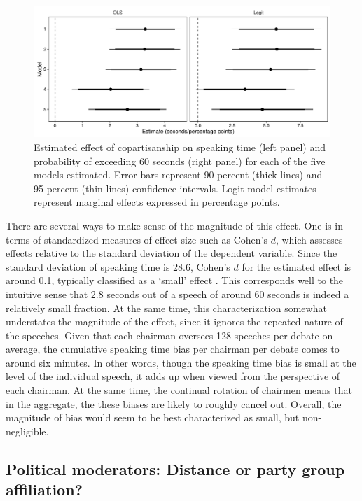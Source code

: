 \documentclass[12pt,a4paper]{article}
\begin{document}
\begin{figure}[!htbp]
\centering
\includegraphics[scale=.65]{../figures/parlbias_effectplot}
  \caption{Estimated effect of copartisanship on speaking time (left panel) and probability of exceeding 60 seconds (right panel) for each of the five models estimated. Error bars represent 90 percent (thick lines) and 95 percent (thin lines) confidence intervals. Logit model estimates represent marginal effects expressed in percentage points.}\label{parlbias_effectplot}
\end{figure}

There are several ways to make sense of the magnitude of this effect. One is in terms of standardized measures of effect size such as Cohen's $d$, which assesses effects relative to the standard deviation of the dependent variable. Since the standard deviation of speaking time is 28.6, Cohen's $d$ for the estimated effect is around 0.1, typically classified as a `small' effect \citep{Cohen1992}. This corresponds well to the intuitive sense that 2.8 seconds out of a speech of around 60 seconds is indeed a relatively small fraction. At the same time, this characterization somewhat understates the magnitude of the effect, since it ignores the repeated nature of the speeches. Given that each chairman oversees 128 speeches per debate on average, the cumulative speaking time bias per chairman per debate comes to around six minutes. In other words, though the speaking time bias is small at the level of the individual speech, it adds up when viewed from the perspective of each chairman. At the same time, the continual rotation of chairmen means that in the aggregate, the these biases are likely to roughly cancel out. Overall, the magnitude of bias would seem to be best characterized as small, but non-negligible.

\subsection{Political moderators: Distance or party group affiliation? }
\end{document}
